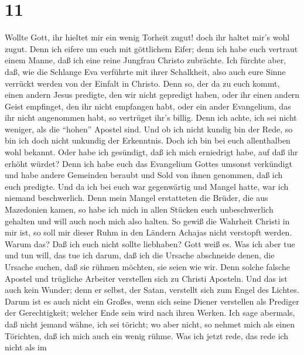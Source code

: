 \hypertarget{section-10}{%
\section{11}\label{section-10}}

 Wollte Gott, ihr hieltet mir ein wenig Torheit zugut! doch
ihr haltet mir's wohl zugut.  Denn ich eifere um euch mit
göttlichem Eifer; denn ich habe euch vertraut einem Manne, daß ich eine
reine Jungfrau Christo zubrächte.  Ich fürchte aber, daß,
wie die Schlange Eva verführte mit ihrer Schalkheit, also auch eure
Sinne verrückt werden von der Einfalt in Christo.  Denn so,
der da zu euch kommt, einen andern Jesus predigte, den wir nicht
gepredigt haben, oder ihr einen andern Geist empfinget, den ihr nicht
empfangen habt, oder ein ander Evangelium, das ihr nicht angenommen
habt, so vertrüget ihr's billig.  Denn ich achte, ich sei
nicht weniger, als die ``hohen'' Apostel sind.  Und ob ich
nicht kundig bin der Rede, so bin ich doch nicht unkundig der
Erkenntnis. Doch ich bin bei euch allenthalben wohl bekannt.
 Oder habe ich gesündigt, daß ich mich erniedrigt habe, auf
daß ihr erhöht würdet? Denn ich habe euch das Evangelium Gottes umsonst
verkündigt  und habe andere Gemeinden beraubt und Sold von
ihnen genommen, daß ich euch predigte.  Und da ich bei euch
war gegenwärtig und Mangel hatte, war ich niemand beschwerlich. Denn
mein Mangel erstatteten die Brüder, die aus Mazedonien kamen, so habe
ich mich in allen Stücken euch unbeschwerlich gehalten und will auch
noch mich also halten.  So gewiß die Wahrheit Christi in
mir ist, so soll mir dieser Ruhm in den Ländern Achajas nicht verstopft
werden.  Warum das? Daß ich euch nicht sollte liebhaben?
Gott weiß es.  Was ich aber tue und tun will, das tue ich
darum, daß ich die Ursache abschneide denen, die Ursache suchen, daß sie
rühmen möchten, sie seien wie wir.  Denn solche falsche
Apostel und trügliche Arbeiter verstellen sich zu Christi Aposteln.
 Und das ist auch kein Wunder; denn er selbst, der Satan,
verstellt sich zum Engel des Lichtes.  Darum ist es auch
nicht ein Großes, wenn sich seine Diener verstellen als Prediger der
Gerechtigkeit; welcher Ende sein wird nach ihren Werken. 
Ich sage abermals, daß nicht jemand wähne, ich sei töricht; wo aber
nicht, so nehmet mich als einen Törichten, daß ich mich auch ein wenig
rühme.  Was ich jetzt rede, das rede ich nicht als im
